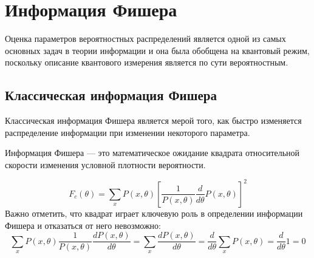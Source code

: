 \section{Информация Фишера}

Оценка параметров вероятностных распределений является одной из самых основных задач в теории информации 
и она была обобщена на квантовый режим\cite{Helstrom1976, Holevo1982}, поскольку описание квантового измерения является по сути вероятностным. 

\subsection{Классическая информация Фишера}
Классическая информация Фишера является мерой того, 
как быстро изменяется распределение информации при изменении некоторого параметра.

\begin{definition}\label{def:fisher-information}
 Информация Фишера --- это математическое ожидание квадрата относительной скорости изменения условной плотности вероятности.
\end{definition}
%
\begin{equation}\label{eq:fisher-information}
  F_c({\theta})= 
      \sum_x{{P}(x,\theta)}
          \left[\frac{1}{P(x,\theta)}
     \frac{d}{d\theta}
  {P(x,\theta)}\right]^2
\end{equation}
%
Важно отметить, 
что квадрат играет ключевую роль в определении информации Фишера 
и отказаться от него невозможно: 
%
\begin{equation}
    \label{eq:2}
        \sum_x{{P}(x,\theta)}
            \frac{1}{P(x,\theta)}
                \frac{dP(x,\theta)}{d\theta} =
                    \sum_x\frac{{dP}(x,\theta)}{d\theta} = 
                \frac{d}{d\theta}\sum_x{{P}(x,\theta)} =
            \frac{d}{d\theta}1 = 
            0
\end{equation}

